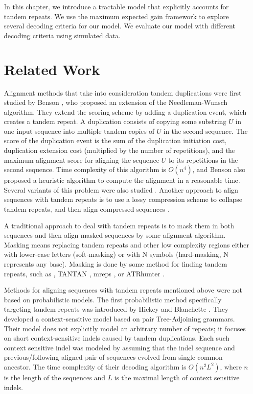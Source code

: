 In this chapter, we introduce a tractable model that explicitly accounts for
tandem repeats. We use the maximum expected gain framework to explore several
decoding criteria for our model. We evaluate our model with different decoding criteria using simulated data.

\section{Related Work}\label{SECTION:REPALNMETHODS}
 
Alignment methods that take into consideration tandem duplications were first
studied by Benson \cite{Benson1997}, who proposed an extension of the
Needleman-Wunsch algorithm. They extend the scoring scheme by adding a duplication
event, which creates a tandem repeat. A duplication consists of copying
some substring $U$ in one input sequence into multiple
tandem copies of $U$ in the second sequence. The score of the duplication
event is the sum of the duplication initiation cost, duplication extension
cost (multiplied by the number of repetitions), and the maximum alignment score
for aligning the sequence $U$ to its repetitions in the second sequence. Time
complexity of this algorithm is $O(n^4)$, and Benson also proposed a heuristic
algorithm to compute the alignment in a reasonable time.  Several variants of
this problem were also studied \cite{Sammeth2006, Berard2006}. Another
approach to align sequences with tandem repeats is to use a lossy compression scheme to collapse tandem repeats,
and then align compressed sequences \cite{Freschi2012}.

A traditional approach to deal with tandem repeats is to mask them in both
sequences and then align masked sequences by some alignment algorithm.  Masking
means replacing tandem repeats and other low complexity regions either with
lower-case letters (soft-masking) or with N symbols (hard-masking, N represents
any base). Masking is done by some method for finding tandem repeats, such as
 \cite{Benson1999}, TANTAN
\cite{Frith2011}, mreps \cite{Kolpakov2003}, or ATRhunter \cite{Wexler2005}. 

Methods for aligning sequences with tandem repeats mentioned above were not based on probabilistic models. The first
probabilistic method specifically targeting tandem repeats was introduced by
Hickey and Blanchette \cite{Hickey2011}.  They developed a context-sensitive
model based on pair Tree-Adjoining grammars.  Their model does not explicitly
model an arbitrary number of repeats; it focuses on short context-sensitive
indels caused by tandem duplications. Each such context sensitive indel was
modeled by assuming that the indel sequence and previous/following aligned pair
of sequences evolved from single common ancestor. The time complexity of their
decoding algorithm is $O(n^2L^2)$, where $n$ is the length of the sequences and
$L$ is the maximal length of context sensitive indels.

